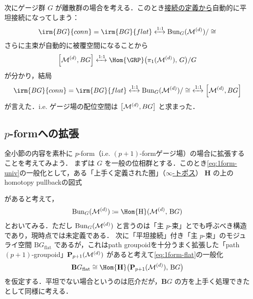 \documentclass[TQFT_main]{subfiles}
\begin{document}
次にゲージ群 $G$ が離散群の場合を考える．このとき\underline{接続の定義から}自動的に平坦接続になってしまう：
\begin{align}
    \label{eq:1form-finite-flat}
    \irm{BG}{conn} = \irm{BG}{flat} \xleftrightarrow{1:1} \mathrm{Bun}_G (\mfdcal{M}{d})/\cong
\end{align}
さらに主束が自動的に被覆空間になることから
\begin{align}
    \comm{\mfdcal{M}{d}}{BG} \xleftrightarrow{1:1} \Hom{\GRP} \bigl( \pi_1(\mfdcal{M}{d}),\, G \bigr) /G
\end{align}
が分かり，結局
\begin{align}
    \label{eq:1form-moduli}
    \irm{BG}{conn} = \irm{BG}{flat} \xleftrightarrow{1:1} \mathrm{Bun}_G (\mfdcal{M}{d})/\cong\; \xleftrightarrow{1:1} \comm{\mfdcal{M}{d}}{BG}
\end{align}
が言えた．i.e. ゲージ場の配位空間は $\comm{\mfdcal{M}{d}}{BG}$ と求まった．

\subsection{$p$-formへの拡張}

全小節の内容を素朴に $p$-form（i.e. $(p+1)$-formゲージ場）の場合に拡張することを考えてみよう．
まずは $G$ を一般の位相群とする．このとき\eqref{eq:1form-univ}の一般化として，ある「上手く定義された圏」（\hyperref[def:infinity-topos]{$\infty$-トポス}） $\mathrm{\bm{H}}$ の上のhomotopy pullbackの図式
\begin{center}
\end{center}
があると考えて，
\begin{align}
    \mathrm{Bun}_G (\mfdcal{M}{d}) \coloneqq \Hom{\mathrm{\bm{H}}} (\mfdcal{M}{d},\, \mathrm{\bm{B}}G)
\end{align}
とおいてみる．ただし $\mathrm{Bun}_G (\mathcal{M}^{(d)})$ と言うのは「主 $p$-束」とでも呼ぶべき構造であり，現時点では未定義である．
次に「平坦接続」付き「主 $p$-束」のモジュライ空間 $\bm{\mathrm{B}}G_{\mathrm{flat}}$ であるが，これはpath groupoidを十分うまく拡張した「path $(p+1)$-groupoid」$\bm{\mathrm{P}}_{p+1}(\mathcal{M}^{(d)})$ があると考えて\eqref{eq:1form-flat}の一般化
\begin{align}
    \bm{\mathrm{B}}G_{\mathrm{flat}} \cong \Hom{\bm{\mathrm{H}}} \bigl( \bm{\mathrm{P}}_{p+1}(\mfdcal{M}{d}),\, \mathrm{\bm{B}}G\bigr) 
\end{align}
を仮定する．平坦でない場合というのは厄介だが，$\mathrm{\bm{B}}G$ の方を上手く処理できたとして同様に考える．
\end{document}

